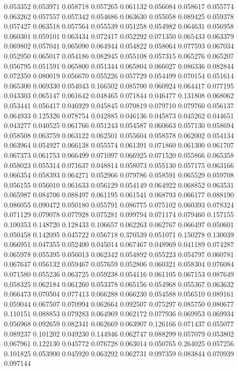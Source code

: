 0.053352
0.053971
0.058718
0.057265
0.061132
0.056084
0.058617
0.055774
0.063262
0.057557
0.057342
0.054686
0.063630
0.055058
0.089425
0.059378
0.057427
0.063518
0.057564
0.055539
0.051258
0.054982
0.064631
0.056958
0.060301
0.059101
0.063434
0.072417
0.052292
0.071350
0.065433
0.063379
0.069802
0.057041
0.065090
0.064944
0.054822
0.058064
0.077593
0.067034
0.052950
0.065017
0.054186
0.082945
0.055108
0.057315
0.065276
0.065207
0.056795
0.051591
0.065800
0.051344
0.065804
0.066027
0.086336
0.082844
0.072350
0.080019
0.056670
0.055226
0.057729
0.054499
0.070154
0.051614
0.065300
0.069330
0.054043
0.166502
0.085700
0.060924
0.064417
0.077195
0.043303
0.065147
0.061642
0.048465
0.071844
0.046477
0.131808
0.068062
0.053441
0.056417
0.046929
0.045845
0.070819
0.079710
0.079760
0.056137
0.064933
0.125326
0.078754
0.042885
0.046136
0.045873
0.045262
0.044651
0.043277
0.040525
0.061766
0.051243
0.054587
0.060663
0.057130
0.058694
0.058508
0.063759
0.063122
0.062501
0.055604
0.058578
0.062002
0.054134
0.063964
0.054927
0.066138
0.055574
0.061391
0.071860
0.061300
0.061707
0.067373
0.061753
0.066499
0.071097
0.066925
0.071520
0.055866
0.065358
0.058023
0.055314
0.071637
0.048814
0.058073
0.055130
0.057175
0.063166
0.066354
0.058393
0.064271
0.052966
0.079786
0.058591
0.065529
0.059708
0.056155
0.056010
0.061633
0.056129
0.054149
0.064922
0.068852
0.063531
0.065987
0.084706
0.088497
0.061195
0.061541
0.068793
0.066177
0.088190
0.086055
0.090472
0.050180
0.055791
0.086775
0.075102
0.060393
0.078324
0.071129
0.079078
0.077928
0.075281
0.099794
0.071174
0.079460
0.157155
0.100353
0.148720
0.128433
0.106657
0.062263
0.062767
0.066497
0.050601
0.050458
0.142095
0.045722
0.056718
0.370539
0.051071
0.150278
0.130039
0.066951
0.047355
0.052400
0.045014
0.067467
0.048969
0.041189
0.074287
0.065978
0.055395
0.056013
0.062342
0.054892
0.055223
0.054797
0.060781
0.067647
0.056132
0.059467
0.057659
0.052806
0.060321
0.058304
0.076084
0.071580
0.055236
0.063725
0.059238
0.054116
0.061105
0.067153
0.087649
0.058325
0.062184
0.061260
0.053378
0.065156
0.054968
0.055367
0.063632
0.066473
0.070504
0.077413
0.066288
0.066230
0.054588
0.056510
0.089161
0.059044
0.067507
0.070994
0.062664
0.092507
0.075297
0.085750
0.080677
0.110151
0.088853
0.079283
0.064969
0.062172
0.077936
0.069953
0.069934
0.056968
0.092659
0.082341
0.062669
0.063907
0.126166
0.071437
0.055077
0.089237
0.101202
0.049230
0.144946
0.062747
0.088299
0.057079
0.053802
0.067961
0.122130
0.045772
0.076728
0.063014
0.050765
0.264025
0.057256
0.101825
0.053900
0.045920
0.063292
0.062731
0.097359
0.083844
0.070939
0.097144
